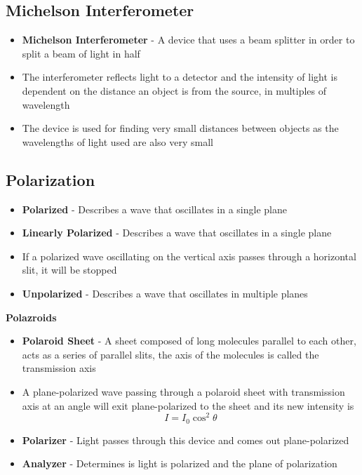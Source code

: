 \subsection{Michelson Interferometer}
\begin{itemize}
    \item \textbf{Michelson Interferometer} - A device that uses a beam splitter in order to split a beam of light in half
    \item The interferometer reflects light to a detector and the intensity of light is dependent on the distance an object is from the source, in multiples of wavelength
    \item The device is used for finding very small distances between objects as the wavelengths of light used are also very small
\end{itemize}

\subsection{Polarization}
\begin{itemize}
    \item \textbf{Polarized} - Describes a wave that oscillates in a single plane
    \item \textbf{Linearly Polarized} - Describes a wave that oscillates in a single plane
    \item If a polarized wave oscillating on the vertical axis passes through a horizontal slit, it will be stopped
    \item \textbf{Unpolarized} - Describes a wave that oscillates in multiple planes
\end{itemize}

\textbf{Polazroids}
\begin{itemize}
    \item \textbf{Polaroid Sheet} - A sheet composed of long molecules parallel to each other, acts as a series of parallel slits, the axis of the molecules is called the transmission axis
    \item A plane-polarized wave passing through a polaroid sheet with transmission axis at an angle will exit plane-polarized to the sheet and its new intensity is \[I=I_0\cos^2{\theta}\]
    \item \textbf{Polarizer} - Light passes through this device and comes out plane-polarized
    \item \textbf{Analyzer} - Determines is light is polarized and the plane of polarization
\end{itemize}

